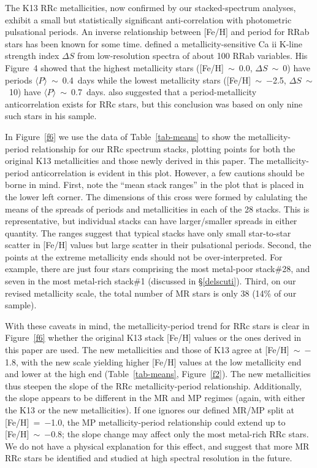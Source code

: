 \documentclass[preprint]{aastex6}
\newcommand\species[2]{#1 {\sc #2}}
\begin{document}
The K13 RRc metallicities, now confirmed by our 
stacked-spectrum analyses, exhibit a small but statistically significant 
anti-correlation with photometric pulsational periods.  
An inverse relationship between [Fe/H] and period for RRab stars has been 
known for some time. 
\cite{preston59} defined a metallicity-sensitive \species{Ca}{ii} K-line 
strength index $\Delta S$ from low-resolution spectra of about 100 
RRab variables.  
His Figure~4 showed that the highest metallicity stars 
([Fe/H]~$\sim$~0.0, $\Delta S$~$\sim$~0) have periods 
$\langle P\rangle$~$\sim$~0.4~days while the lowest metallicity stars
([Fe/H]~$\sim$~$-$2.5, $\Delta S$~$\sim$~10) have 
$\langle P\rangle$~$\sim$~0.7~days.
\citeauthor{preston59} also suggested that a period-metallicity 
anticorrelation exists for RRc stars, but this conclusion was based on 
only nine such stars in his sample.

In Figure~\ref{f6} we use the data of Table~\ref{tab-means}
to show the metallicity-period relationship for our RRc spectrum stacks, 
plotting points for both the original K13 metallicities and those newly 
derived in this paper.
The metallicity-period anticorrelation is evident in this plot.
However, a few cautions should be borne in mind.
First, note the ``mean stack ranges'' in the plot that is placed in the 
lower left corner.
The dimensions of this cross were formed by calulating the means of 
the spreads of periods and metallicities in each of the 28 stacks.
This is representative, but individual stacks can have larger/smaller 
spreads in either quantity.
The ranges suggest that typical stacks have only small star-to-star scatter in 
[Fe/H] values but large scatter in their pulsational periods.
Second, the points at the extreme metallicity ends should not be 
over-interpreted.
For example, there are just four stars comprising the most metal-poor 
stack\#28, and seven in the most metal-rich stack\#1 (discussed in 
\S\ref{delscuti}).
Third, on our revised metallicity scale, the total number of MR stars 
is only 38 (14\% of our sample).

With these caveats in mind, the metallicity-period trend for 
RRc stars is clear in Figure~\ref{f6} whether the original K13 stack 
[Fe/H] values or the ones derived in this paper are used.
The new metallicities and those of K13 agree at [Fe/H]~$\sim$~$-$1.8,
with the new scale yielding higher [Fe/H] values at the low metallicity end
and lower at the high end (Table~\ref{tab-means}, Figure~\ref{f2}).
The new metallicities thus steepen the slope of the RRc metallicity-period
relationship.
Additionally, the slope appears to be different in the MR and MP regimes
(again, with either the K13 or the new metallicities).
If one ignores our defined MR/MP split at [Fe/H]~=~$-$1.0, the MP
metallicity-period relationship could extend up to [Fe/H]~$\sim$~$-$0.8;
the slope change may affect only the most metal-rich RRc stars.
We do not have a physical explanation for this effect, and suggest that
more MR RRc stars be identified and studied at high spectral resolution 
in the future.
\end{document}
